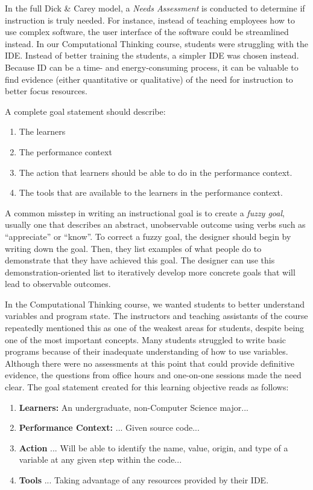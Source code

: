 In the full Dick \& Carey model, a \textit{Needs Assessment} is conducted to determine if instruction is truly needed.
For instance, instead of teaching employees how to use complex software, the user interface of the software could be streamlined instead.
In our Computational Thinking course, students were struggling with the IDE.
Instead of better training the students, a simpler IDE was chosen instead.
Because ID can be a time- and energy-consuming process, it can be valuable to find evidence (either quantitative or qualitative) of the need for instruction to better focus resources.

A complete goal statement should describe:
\vspace{-\medskipamount}

\begin{enumerate}
\item The learners
\item The performance context
\item The action that learners should be able to do in the performance context.
\item The tools that are available to the learners in the performance context.
\end{enumerate}
A common misstep in writing an instructional goal is to create a \textit{fuzzy goal}, usually one that describes an abstract, unobservable outcome using verbs such as ``appreciate'' or ``know''.
To correct a fuzzy goal, the designer should begin by writing down the goal.
Then, they list examples of what people do to demonstrate that they have achieved this goal.
The designer can use this demonstration-oriented list to iteratively develop more concrete goals that will lead to observable outcomes.

In the Computational Thinking course, we wanted students to better understand variables and program state.
The instructors and teaching assistants of the course repeatedly mentioned this as one of the weakest areas for students, despite being one of the most important concepts.
Many students struggled to write basic programs because of their inadequate understanding of how to use variables.
Although there were no assessments at this point that could provide definitive evidence, the questions from office hours and one-on-one sessions made the need clear.
The goal statement created for this learning objective reads as follows:

\begin{enumerate}
\item \textbf{Learners: } An undergraduate, non-Computer Science major...
\item \textbf{Performance Context:} ... Given source code...
\item \textbf{Action} ... Will be able to identify the name, value, origin, and type of a variable at any given step within the code...
\item \textbf{Tools} ... Taking advantage of any resources provided by their IDE.
\end{enumerate}


